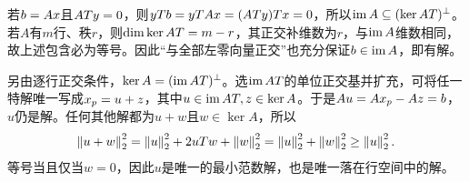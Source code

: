 \label{der:4-4}
若$b=Ax$且$ATy=0$，则$yTb=yT Ax=(ATy)Tx=0$，所以$\operatorname{im} A\subseteq(\ker AT)^\perp$。若$A$有$m$行、秩$r$，则$\dim\ker AT=m-r$，其正交补维数为$r$，与$\operatorname{im} A$维数相同，故上述包含必为等号。因此“与全部左零向量正交”也充分保证$b\in\operatorname{im} A$，即有解。

另由逐行正交条件，$\ker A=(\operatorname{im} AT)^\perp$。选$\operatorname{im} AT$的单位正交基并扩充，可将任一特解唯一写成$x_p=u+z$，其中$u\in\operatorname{im} AT,z\in\ker A$。于是$Au=Ax_p-Az=b$，$u$仍是解。任何其他解都为$u+w$且$w\in\ker A$，所以
\[\left\lVert u+w\right\rVert_2^2=\left\lVert u\right\rVert_2^2+2uT w+\left\lVert w\right\rVert_2^2=\left\lVert u\right\rVert_2^2+\left\lVert w\right\rVert_2^2\ge\left\lVert u\right\rVert_2^2.\]
等号当且仅当$w=0$，因此$u$是唯一的最小范数解，也是唯一落在行空间中的解。
